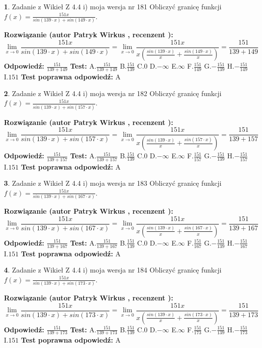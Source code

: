 \documentclass[12pt, a4paper]{article}
\theoremstyle{definition} %
\newtheorem{zad}{}
\newcommand{\zadStart}[1]{\begin{zad}#1\newline}
\newcommand{\zadStop}{\end{zad}}
\newcommand{\rozwStart}[2]{\noindent \textbf{Rozwiązanie (autor #1 , recenzent #2): }\newline}
\newcommand{\rozwStop}{\newline}
\newcommand{\odpStart}{\noindent \textbf{Odpowiedź:}\newline}
\newcommand{\odpStop}{\newline}
\newcommand{\testStart}{\noindent \textbf{Test:}\newline}
\newcommand{\testStop}{\newline}
\newcommand{\kluczStart}{\noindent \textbf{Test poprawna odpowiedź:}\newline}
\newcommand{\kluczStop}{\newline}
\begin{document}
\zadStart{Zadanie z Wikieł Z 4.4 i) moja wersja nr 181}
Obliczyć granicę funkcji $f(x)=\frac{151x}{sin(139\cdot x) +sin(149\cdot x)}$.
\zadStop
\rozwStart{Patryk Wirkus}{}
$$\lim\limits_{x\to 0}\frac{151x}{sin(139\cdot x) +sin(149\cdot x)}=\lim\limits_{x\to 0}\frac{151x}{x(\frac{sin(139\cdot x)}{x}+\frac{sin(149\cdot x)}{x})}=\frac{151}{139+149}$$
\rozwStop
\odpStart
$\frac{151}{139+149}$
\odpStop
\testStart
A.$\frac{151}{139+149}$
B.$\frac{151}{139}$
C.$0$
D.$-\infty$
E.$\infty$
F.$\frac{151}{149}$
G.$-\frac{151}{139}$
H.$-\frac{151}{149}$
I.$151$
\testStop
\kluczStart
A
\kluczStop



\zadStart{Zadanie z Wikieł Z 4.4 i) moja wersja nr 182}
Obliczyć granicę funkcji $f(x)=\frac{151x}{sin(139\cdot x) +sin(157\cdot x)}$.
\zadStop
\rozwStart{Patryk Wirkus}{}
$$\lim\limits_{x\to 0}\frac{151x}{sin(139\cdot x) +sin(157\cdot x)}=\lim\limits_{x\to 0}\frac{151x}{x(\frac{sin(139\cdot x)}{x}+\frac{sin(157\cdot x)}{x})}=\frac{151}{139+157}$$
\rozwStop
\odpStart
$\frac{151}{139+157}$
\odpStop
\testStart
A.$\frac{151}{139+157}$
B.$\frac{151}{139}$
C.$0$
D.$-\infty$
E.$\infty$
F.$\frac{151}{157}$
G.$-\frac{151}{139}$
H.$-\frac{151}{157}$
I.$151$
\testStop
\kluczStart
A
\kluczStop



\zadStart{Zadanie z Wikieł Z 4.4 i) moja wersja nr 183}
Obliczyć granicę funkcji $f(x)=\frac{151x}{sin(139\cdot x) +sin(167\cdot x)}$.
\zadStop
\rozwStart{Patryk Wirkus}{}
$$\lim\limits_{x\to 0}\frac{151x}{sin(139\cdot x) +sin(167\cdot x)}=\lim\limits_{x\to 0}\frac{151x}{x(\frac{sin(139\cdot x)}{x}+\frac{sin(167\cdot x)}{x})}=\frac{151}{139+167}$$
\rozwStop
\odpStart
$\frac{151}{139+167}$
\odpStop
\testStart
A.$\frac{151}{139+167}$
B.$\frac{151}{139}$
C.$0$
D.$-\infty$
E.$\infty$
F.$\frac{151}{167}$
G.$-\frac{151}{139}$
H.$-\frac{151}{167}$
I.$151$
\testStop
\kluczStart
A
\kluczStop



\zadStart{Zadanie z Wikieł Z 4.4 i) moja wersja nr 184}
Obliczyć granicę funkcji $f(x)=\frac{151x}{sin(139\cdot x) +sin(173\cdot x)}$.
\zadStop
\rozwStart{Patryk Wirkus}{}
$$\lim\limits_{x\to 0}\frac{151x}{sin(139\cdot x) +sin(173\cdot x)}=\lim\limits_{x\to 0}\frac{151x}{x(\frac{sin(139\cdot x)}{x}+\frac{sin(173\cdot x)}{x})}=\frac{151}{139+173}$$
\rozwStop
\odpStart
$\frac{151}{139+173}$
\odpStop
\testStart
A.$\frac{151}{139+173}$
B.$\frac{151}{139}$
C.$0$
D.$-\infty$
E.$\infty$
F.$\frac{151}{173}$
G.$-\frac{151}{139}$
H.$-\frac{151}{173}$
I.$151$
\testStop
\kluczStart
A
\kluczStop
\end{document}

